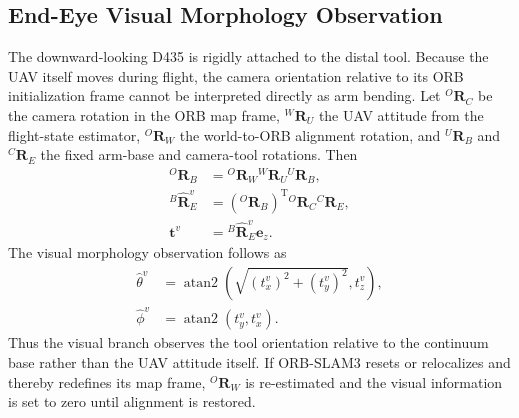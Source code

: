 \documentclass[journal,twoside]{IEEEtran}
\begin{document}
\subsection{End-Eye Visual Morphology Observation}
The downward-looking D435 is rigidly attached to the distal tool. Because the UAV itself moves during flight, the camera orientation relative to its ORB initialization frame cannot be interpreted directly as arm bending. Let ${}^{O}\mathbf R_C$ be the camera rotation in the ORB map frame, ${}^{W}\mathbf R_U$ the UAV attitude from the flight-state estimator, ${}^{O}\mathbf R_W$ the world-to-ORB alignment rotation, and ${}^{U}\mathbf R_B$ and ${}^{C}\mathbf R_E$ the fixed arm-base and camera-tool rotations. Then
\begin{equation}
\begin{aligned}
{}^{O}\mathbf R_B&={}^O\mathbf R_W{}^W\mathbf R_U{}^U\mathbf R_B,\\
{}^B\hat{\mathbf R}_E^v&=({}^{O}\mathbf R_B)^{\mathrm T}{}^{O}\mathbf R_C{}^{C}\mathbf R_E,\\
\mathbf t^v&={}^B\hat{\mathbf R}_E^v\mathbf e_z.
\end{aligned}
\label{eq:visual_rotation}
\end{equation}
The visual morphology observation follows as
\begin{equation}
\begin{aligned}
\hat\theta^v&=\operatorname{atan2}\!\left(
\sqrt{(t_x^v)^2+(t_y^v)^2},t_z^v\right),\\
\hat\phi^v&=\operatorname{atan2}(t_y^v,t_x^v).
\end{aligned}
\label{eq:visual_morphology}
\end{equation}
Thus the visual branch observes the tool orientation relative to the continuum base rather than the UAV attitude itself. If ORB-SLAM3 resets or relocalizes and thereby redefines its map frame, ${}^{O}\mathbf R_W$ is re-estimated and the visual information is set to zero until alignment is restored.
\end{document}
